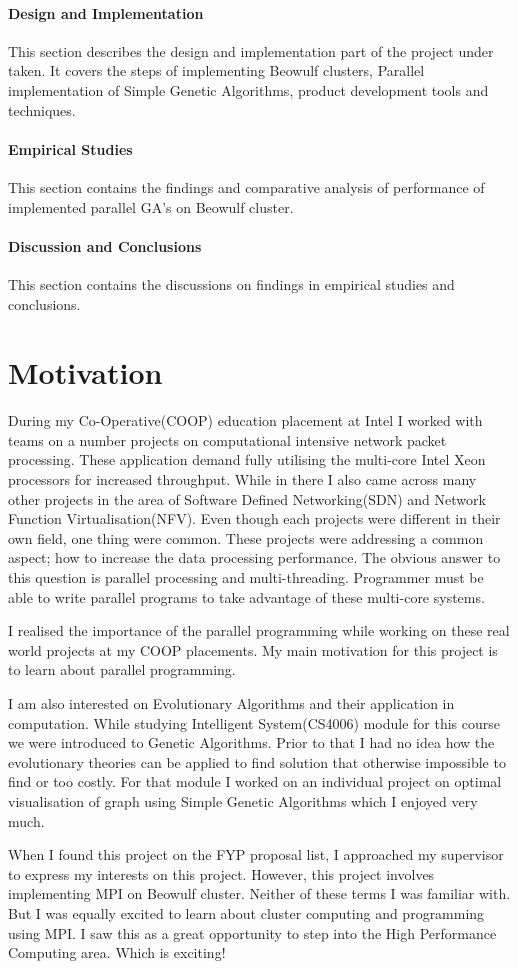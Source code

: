 \paragraph {Design and Implementation}
This section describes the design and implementation part of the project under taken. It covers the steps of implementing Beowulf clusters, Parallel implementation of Simple Genetic Algorithms, product development tools and techniques.
\paragraph {Empirical Studies}
This section contains the findings and comparative analysis of performance of implemented parallel GA's on Beowulf cluster.
\paragraph {Discussion and Conclusions}
This section contains the discussions on findings in empirical studies and conclusions.


\section{Motivation}
During my Co-Operative(COOP) education placement at Intel I worked with teams on a number projects on computational intensive network packet processing. These application demand fully utilising the multi-core Intel Xeon processors for increased throughput. While in there I also came across many other projects in the area of Software Defined Networking(SDN) and Network Function Virtualisation(NFV). Even though each projects were different in their own field, one thing were common. These projects were addressing a common aspect; how to increase the data processing performance. The obvious answer to this question is parallel processing and multi-threading. Programmer must be able to write parallel programs to take advantage of these multi-core systems.

I realised the importance of the parallel programming while working on these real world projects at my COOP placements. My main motivation for this project is to learn about parallel programming.

I am also interested on Evolutionary Algorithms and their application in computation. While studying Intelligent System(CS4006) module for this course we were introduced to Genetic Algorithms. Prior to that I had no idea how the evolutionary theories can be applied to find solution that otherwise impossible to find or too costly. For that module I worked on an individual project on optimal visualisation of graph using Simple Genetic Algorithms which I enjoyed very much.

When I found this project on the FYP proposal list, I approached my supervisor to express my interests on this project. However, this project involves implementing MPI on Beowulf cluster. Neither of these terms I was familiar with. But I was equally excited to learn about cluster computing and programming using MPI. I saw this as a great opportunity to step into the High Performance Computing area. Which is exciting!

